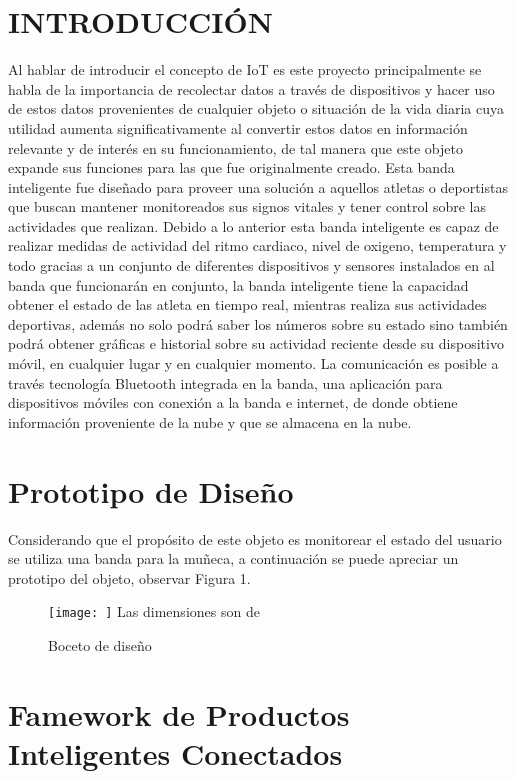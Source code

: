 \documentclass[osajnl,twocolumn,showpacs,superscriptaddress,10pt]{revtex4-1}
\begin{document}
\section{INTRODUCCIÓN}
Al hablar de introducir el concepto de IoT es este proyecto principalmente se habla de la importancia de recolectar datos a través de dispositivos y hacer uso de estos datos provenientes de cualquier objeto o situación de la vida diaria cuya utilidad aumenta significativamente al convertir estos datos en información relevante y de interés en su funcionamiento, de tal manera que este objeto expande sus funciones para las que fue originalmente creado. Esta banda inteligente fue diseñado para proveer una solución a aquellos atletas o deportistas que buscan mantener monitoreados sus signos vitales y tener control sobre las actividades que realizan. Debido a lo anterior esta banda inteligente es capaz de realizar medidas de actividad del ritmo cardiaco, nivel de oxigeno, temperatura y todo gracias a un conjunto de diferentes dispositivos y sensores instalados en al banda que funcionarán en conjunto, la banda inteligente tiene la capacidad obtener el estado de las atleta en tiempo real, mientras realiza sus actividades deportivas, además no solo podrá saber los números sobre su estado sino también podrá obtener gráficas e historial sobre su actividad reciente desde su dispositivo móvil, en cualquier lugar y en cualquier momento. La comunicación es posible a través tecnología Bluetooth integrada en la banda, una aplicación para dispositivos móviles con conexión a la banda e internet, de donde obtiene información proveniente de la nube y que se almacena en la nube.

\section{Prototipo de Diseño}
Considerando que el propósito de este objeto es monitorear el estado del usuario se utiliza una banda para la muñeca, a continuación se puede apreciar un prototipo del objeto, observar Figura 1.


\begin{figure} [H] \centering 
\caption{Boceto de diseño}

\texttt{[image: ]} 
Las dimensiones son de 
\end{figure}

\section{Famework de Productos Inteligentes Conectados}
\end{document}
